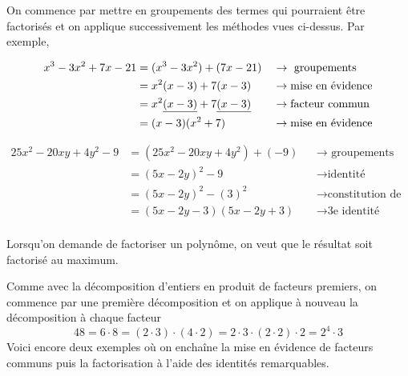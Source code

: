 \documentclass[a4paper,12pt]{report}
\begin{document}
On commence par mettre en groupements des termes qui pourraient être factorisés et on applique successivement les méthodes vues ci-dessus.
Par exemple,
\begin{tasks}
	\task \vspace{-2em}\begin{align*}
	x^3-3x^2+7x-21&=(x^3-3x^2)+(7x-21) &&\rightarrow\text{ groupements}\\
		      &=x^2(x-3)+7(x-3)&&\rightarrow \text{mise en évidence}\\
		      &=x^2\uline{(x-3)}+7\uline{(x-3)}&&\rightarrow \text{facteur commun}\\
		      &=(x-3)(x^2+7)&&\rightarrow \text{mise en évidence}
\end{align*}

\task	
\vspace{-2em}\begin{align*}
	25x^2-20xy+4y^2-9&=(25x^2-20xy+4y^2)+(-9)&&\rightarrow \text{ groupements}\\
		      &=(5x-2y)^2-9&&\rightarrow \text{identité remarquable}\\
		      &=(5x-2y)^2-(3)^2&& \rightarrow \text{constitution de l'identité}\\
		      &=(5x-2y-3)(5x-2y+3)&&\rightarrow \text{3e identité remarquable}\\
\end{align*}
		\end{tasks}
		\vspace{-1cm}
\begin{rem}
	Lorsqu'on demande de factoriser un polynôme, on veut que le résultat soit factorisé au maximum. 
\end{rem}
Comme avec la décomposition d'entiers en produit de facteurs premiers, on commence par une première décomposition et on applique à nouveau la décomposition à chaque facteur
	\[
	48=6\cdot 8=(2\cdot 3)\cdot (4\cdot 2)=2\cdot 3\cdot (2\cdot 2)\cdot 2=2^4\cdot 3	
\]
Voici encore deux exemples où on enchaîne la mise en évidence de facteurs communs puis la factorisation à l'aide des identités remarquables.
\end{document}

